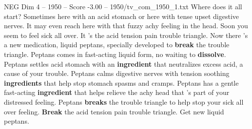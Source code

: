 \begin{textsample}{NEG Dim 4 – 1950 – Score -3.00 – 1950/tv\_com\_1950\_1.txt}  \label{ex:f4_neg_012}
Where does it all start?
Sometimes here with an acid stomach or here with tense upset digestive nerves.
It may even reach here with that fuzzy achy feeling in the head.
Soon you seem to feel sick all over.
It 's the acid tension pain trouble triangle.
Now there 's a new medication, liquid peptans, specially developed to \textbf{break} the trouble triangle.
Peptans comes in fast-acting liquid form, no waiting to \textbf{dissolve}.
Peptans settles acid stomach with an \textbf{ingredient} that neutralizes excess acid, a cause of your trouble.
Peptans calms digestive nerves with tension soothing \textbf{ingredients} that help stop stomach spasms and cramps.
Peptans has a gentle fast-acting \textbf{ingredient} that helps relieve the achy head that 's part of your distressed feeling.
Peptans \textbf{breaks} the trouble triangle to help stop your sick all over feeling. \textbf{Break} the acid tension pain trouble triangle.
Get new liquid peptans.

\end{textsample}
